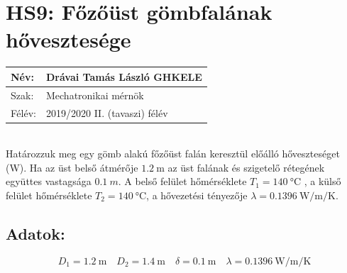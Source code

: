 
\section*{HS9: Főzőüst gömbfalának hővesztesége}
\begin{tabular}{ | p{2cm} | p{14cm} | } 
	\hline
	Név: & Drávai Tamás László GHKELE\\ 
	\hline
	Szak: & Mechatronikai mérnök \\ 
	\hline
	Félév: & 2019/2020 II. (tavaszi) félév \\ 
	\hline
\end{tabular}
\vspace{4mm} 
\\Határozzuk meg egy gömb alakú főzőüst falán keresztül előálló hőveszteséget (W).  Ha az üst belső átmérője $\SI{1,2}{\meter}$  az üst falának és szigetelő rétegének együttes vastagsága $\SI{0,1}{m}$. A belső felület hőmérséklete $T_1=\SI{140}{\celsius}$ , a külső felület hőmérséklete  $T_2=\SI{140}{\celsius}$,  a hővezetési tényezője $\lambda=\SI[per-mode=fraction]{0,1396}{\watt\per\meter\per\kelvin}$.
\subsection*{ {Adatok:}}
\begin{equation*}
D_1=\SI{1,2}{\meter}  \quad  D_2=\SI{1,4}{\meter} \quad \delta=\SI{0,1}{\meter}\quad
\lambda=\SI[per-mode=fraction]{0,1396}{\watt\per\meter\per\kelvin}
\end{equation*}
